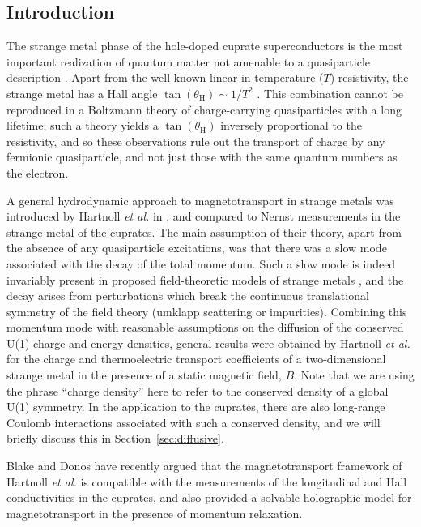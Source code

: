 \documentclass[10pt, oneside]{book}
\begin{document}
\begin{doublespace}
\section{Introduction}
\label{sec:intro}

The strange metal phase of the hole-doped cuprate superconductors is the most important realization of quantum matter
not amenable to a quasiparticle description \cite{lt,sk}. Apart from the well-known linear in temperature ($T$) resistivity, 
the strange metal has a Hall angle $\tan (\theta_{\mathrm{H}}) \sim 1/T^2$ \cite{Chien1991,pwa}. This combination cannot be reproduced in a Boltzmann 
theory of charge-carrying
quasiparticles with a long lifetime; such a theory yields a $\tan (\theta_{\mathrm{H}})$ inversely proportional to the resistivity, 
and so these observations rule out the transport of charge by any fermionic quasiparticle, and not just those
with the same quantum numbers as the electron.

A general hydrodynamic approach to magnetotransport in strange metals was introduced by Hartnoll {\em et al.} in \cite{hkms}, and compared
to Nernst measurements in the strange metal of the cuprates. 
The main assumption of their theory, apart from the absence of any quasiparticle excitations, was that there was a slow mode associated with
the decay of the total momentum. Such a slow mode is indeed invariably present in proposed field-theoretic models of strange metals \cite{Hartnoll:2014gba,Patel:2014jfa}, 
and the decay arises from perturbations which break the continuous translational symmetry of the field theory (umklapp scattering or impurities).
Combining this momentum mode with reasonable assumptions on the diffusion of the conserved U(1) charge and energy densities, general results were
obtained by Hartnoll {\em et al.} \cite{hkms} for the charge and thermoelectric transport coefficients of a two-dimensional strange metal in the presence of a static magnetic field, $B$. 
Note that we are using the phrase ``charge density'' here to refer to the conserved density of a global U(1) symmetry. In the application to the cuprates, there are
also long-range Coulomb interactions associated with such a conserved density, and we will briefly discuss this in Section~\ref{sec:diffusive}.

Blake and Donos \cite{Blake:2014yla} have recently argued that the magnetotransport framework of Hartnoll {\em et al.}  is compatible with the measurements of the 
longitudinal and Hall conductivities in the cuprates, and also provided a solvable holographic model for magnetotransport in the presence of momentum relaxation.


\end{doublespace}
\end{document}
